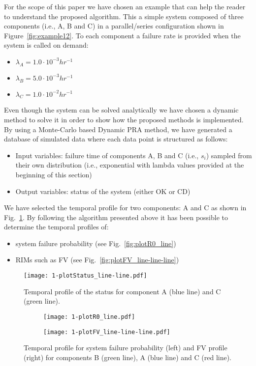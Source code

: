 For the scope of this paper we have chosen an example that can help the reader to 
understand the proposed algorithm. This a simple system composed of three components 
(i.e., A, B and C) in a parallel/series configuration shown in Figure~\ref{fig:example12}. 
To each component a failure rate is 
provided when the system is called on demand:
\begin{itemize}
  \item $\lambda_A=1.0 \cdot 10^{-3} hr^{-1}$
  \item $\lambda_B=5.0 \cdot 10^{-3} hr^{-1}$
  \item $\lambda_C=1.0 \cdot 10^{-2} hr^{-1}$
\end{itemize}
  
Even though the system can be solved analytically we have chosen a dynamic method to solve it in 
order to show how the proposed methods is implemented. 
By using a Monte-Carlo based Dynamic PRA method, we have generated a database of simulated data 
where each data point is structured as follows:
\begin{itemize}
  \item Input variables: failure time of components A, B and C (i.e., $s_i$) sampled from their 
        own distribution (i.e., exponential with lambda values provided at the beginning of this section)
  \item Output variables: status of the system (either OK or CD)
\end{itemize}

We have selected the temporal profile for two components: A and C as shown in Fig.~\ref{fig:plotStatus_line-line}. 
By following the algorithm presented above it has been possible to determine the temporal profiles of:
\begin{itemize}
  \item system failure probability (see Fig.~\ref{fig:plotR0_line})
  \item RIMs such as FV (see Fig.~\ref{fig:plotFV_line-line-line}) 
\end{itemize}

\begin{figure}
    \centering
    \centerline{\texttt{[image: 1-plotStatus\_line-line.pdf]}}
    \caption{Temporal profile of the status for component A (blue line) and C (green line).}
    \label{fig:plotStatus_line-line}
\end{figure}

\begin{figure}
  \centering
  \begin{subfigure}{.5\textwidth}
    \centering
    \centerline{\texttt{[image: 1-plotR0\_line.pdf]}}
  \end{subfigure}%
  \begin{subfigure}{.5\textwidth}
    \centering
    \centerline{\texttt{[image: 1-plotFV\_line-line-line.pdf]}}
  \end{subfigure}
  \caption{Temporal profile for system failure probability (left) and FV profile (right) for 
           components B (green line), A (blue line) and C (red line).}
  \label{fig:margin0}
\end{figure}


